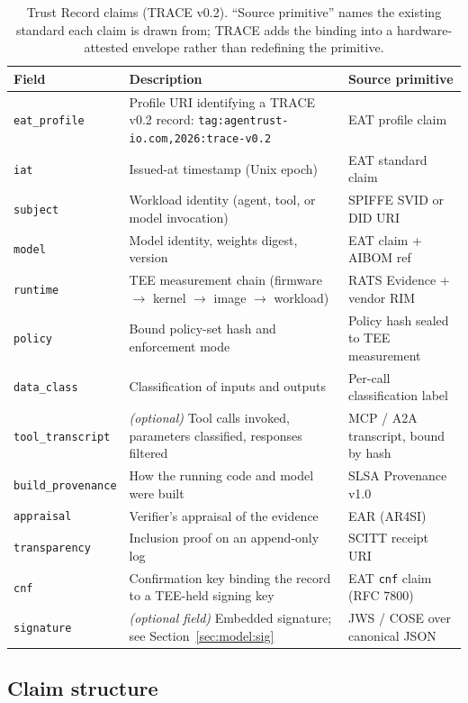 \begin{table}[h]
\centering
\small
\caption{Trust Record claims (TRACE v0.2). ``Source primitive'' names the existing
standard each claim is drawn from; TRACE adds the binding into a hardware-attested
envelope rather than redefining the primitive.}
\label{tab:fields}
\begin{tabular}{p{2.9cm}p{6.2cm}p{3.4cm}}
\toprule
Field & Description & Source primitive \\
\midrule
\texttt{eat\_profile} & Profile URI identifying a TRACE v0.2 record:
  \texttt{tag:agentrust-io.com,2026:trace-v0.2} & EAT profile claim \\
\texttt{iat} & Issued-at timestamp (Unix epoch) & EAT standard claim \\
\texttt{subject} & Workload identity (agent, tool, or model invocation) &
  SPIFFE SVID or DID URI \\
\texttt{model} & Model identity, weights digest, version & EAT claim + AIBOM ref \\
\texttt{runtime} & TEE measurement chain (firmware $\rightarrow$ kernel
  $\rightarrow$ image $\rightarrow$ workload) & RATS Evidence + vendor RIM \\
\texttt{policy} & Bound policy-set hash and enforcement mode &
  Policy hash sealed to TEE measurement \\
\texttt{data\_class} & Classification of inputs and outputs &
  Per-call classification label \\
\texttt{tool\_transcript} & \emph{(optional)} Tool calls invoked, parameters
  classified, responses filtered & MCP / A2A transcript, bound by hash \\
\texttt{build\_provenance} & How the running code and model were built &
  SLSA Provenance v1.0 \\
\texttt{appraisal} & Verifier's appraisal of the evidence & EAR (AR4SI) \\
\texttt{transparency} & Inclusion proof on an append-only log & SCITT receipt URI \\
\texttt{cnf} & Confirmation key binding the record to a TEE-held signing key &
  EAT \texttt{cnf} claim (RFC 7800) \\
\texttt{signature} & \emph{(optional field)} Embedded signature; see
  Section~\ref{sec:model:sig} & JWS / COSE over canonical JSON \\
\bottomrule
\end{tabular}
\end{table}

\subsection{Claim structure}

